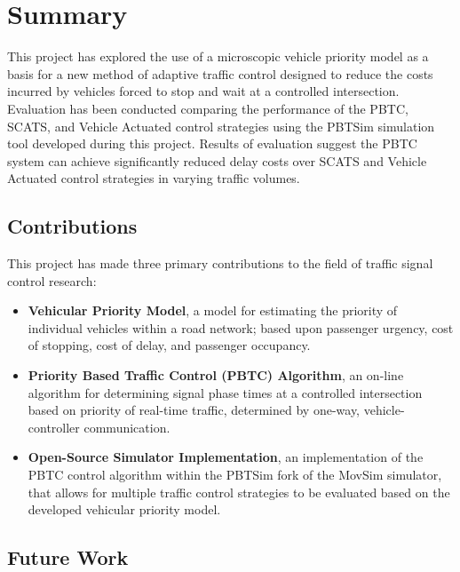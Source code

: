 \chapter{Summary}

This project has explored the use of a microscopic vehicle priority model as a basis for a new method of adaptive traffic control designed to reduce the costs incurred by vehicles forced to stop and wait at a controlled intersection. Evaluation has been conducted comparing the performance of the PBTC, SCATS, and Vehicle Actuated control strategies using the PBTSim simulation tool developed during this project. Results of evaluation suggest the PBTC system can achieve significantly reduced delay costs over SCATS and Vehicle Actuated control strategies in varying traffic volumes.


\section{Contributions}

This project has made three primary contributions to the field of traffic signal control research:

\begin{itemize}
\item \textbf{Vehicular Priority Model}, a model for estimating the priority of individual vehicles within a road network; based upon passenger urgency, cost of stopping, cost of delay, and passenger occupancy.
\item \textbf{Priority Based Traffic Control (PBTC) Algorithm}, an on-line algorithm for determining signal phase times at a controlled intersection based on priority of real-time traffic, determined by one-way, vehicle-controller communication. 
\item \textbf{Open-Source Simulator Implementation}, an implementation of the PBTC control algorithm within the PBTSim fork of the MovSim simulator, that allows for multiple traffic control strategies to be evaluated based on the developed vehicular priority model.
\end{itemize}
 
\section{Future Work}

